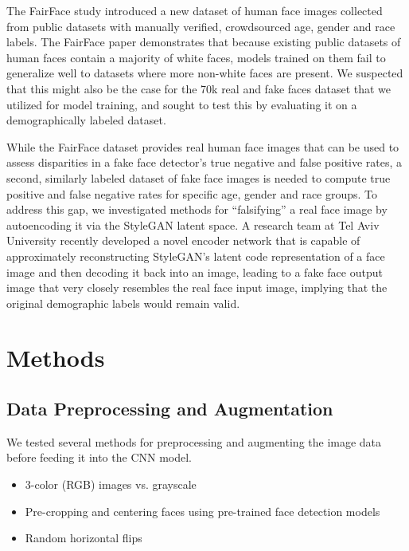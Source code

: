 \documentclass[11pt, letterpaper]{article}
\providecommand{\tightlist}{%
  \setlength{\itemsep}{0pt}\setlength{\parskip}{0pt}
}
\begin{document}
\begin{multicols}{2}
  The FairFace\cite{karkkainen2019fairface} study introduced a new dataset of
  human face images collected from public datasets with manually verified,
  crowdsourced age, gender and race labels. The FairFace paper demonstrates that
  because existing public datasets of human faces contain a majority of white
  faces, models trained on them fail to generalize well to datasets where more
  non-white faces are present. We suspected that this might also be the case for
  the 70k real and fake faces dataset that we utilized for model training, and
  sought to test this by evaluating it on a demographically labeled dataset.

  While the FairFace dataset provides real human face images that can be used to
  assess disparities in a fake face detector's true negative and false positive
  rates, a second, similarly labeled dataset of fake face images is needed to
  compute true positive and false negative rates for specific age, gender and
  race groups. To address this gap, we investigated methods for ``falsifying'' a
  real face image by autoencoding it via the StyleGAN latent space. A research
  team at Tel Aviv University recently developed a novel encoder
  network\cite{richardson2020encoding} that is capable of approximately
  reconstructing StyleGAN's latent code representation of a face image and then
  decoding it back into an image, leading to a fake face output image that very
  closely resembles the real face input image, implying that the original
  demographic labels would remain valid.

  \section{Methods}

  \subsection{Data Preprocessing and Augmentation}

  We tested several methods for preprocessing and augmenting the image data
  before feeding it into the CNN model.

  \begin{itemize}
    \tightlist
  \item 3-color (RGB) images vs. grayscale
  \item Pre-cropping and centering faces using pre-trained face detection models
  \item Random horizontal flips
  \end{itemize}


\end{multicols}
\end{document}
